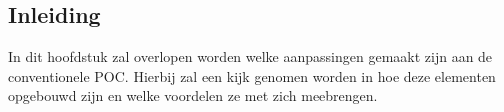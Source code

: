 
\chapter{}%
\label{ch:proofofconceptThreeJS}

\section{Inleiding}

In dit hoofdstuk zal overlopen worden welke aanpassingen gemaakt zijn aan de conventionele POC. Hierbij zal een kijk genomen worden in hoe deze elementen opgebouwd zijn en welke voordelen ze met zich meebrengen.